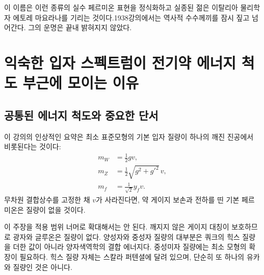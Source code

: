 이 이름은 이런 종류의 실수 페르미온 표현을 정식화하고 실종된 젊은 이탈리아 물리학자 에토레 마요라나를 기리는 것이다.1938강의에서는 역사적 수수께끼를 잠시 짚고 넘어간다. 그의 운명은 끝내 밝혀지지 않았다.

\section{익숙한 입자 스펙트럼이 전기약 에너지 척도 부근에 모이는 이유}

\subsection{공통된 에너지 척도와 중요한 단서}

\begin{classroomqa}
\end{classroomqa}

이 강의의 인상적인 요약은 최소 표준모형의 기본 입자 질량이 하나의 깨진 진공에서 비롯된다는 것이다:
\begin{align}
  m_W&=\frac12gv,\\
  m_Z&=\frac12\sqrt{g^2+g'^2}\,v,\\
  m_f&=\frac1{\sqrt2}y_fv.
  \label{eq:l09-electroweak-mass-summary}
\end{align}
무차원 결합상수를 고정한 채 \(v\)가 사라진다면, 약 게이지 보손과 전하를 띤 기본 페르미온은 질량이 없을 것이다.

이 주장을 적용 범위 너머로 확대해서는 안 된다. 깨지지 않은 게이지 대칭이 보호하므로 광자와 글루온은 질량이 없다. 양성자와 중성자 질량의 대부분은 쿼크의 힉스 질량을 더한 값이 아니라 양자색역학의 결합 에너지다. 중성미자 질량에는 최소 모형의 확장이 필요하다. 힉스 질량 자체는 스칼라 퍼텐셜에 달려 있으며, 단순히 또 하나의 유카와 질량인 것은 아니다.

